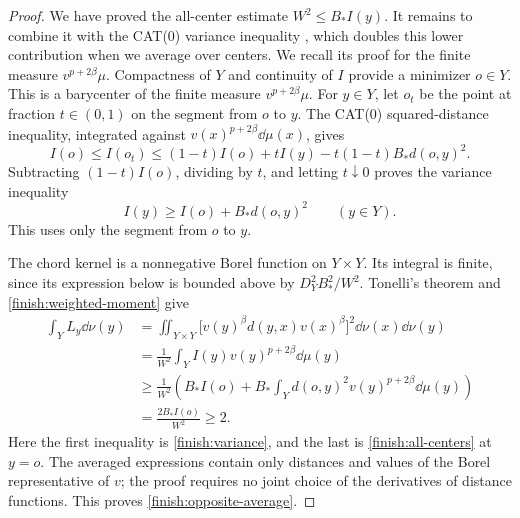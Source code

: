 \begin{proof}
We have proved the all-center estimate \(W^2\le B_*I(y)\).
It remains to combine it with the CAT(0) variance inequality
\cite[Proposition~4.4]{Sturm2003}, which doubles this lower contribution
when we average over centers. We recall its proof for the finite measure
$v^{p+2\beta}\mu$.
Compactness of \(Y\) and continuity of \(I\) provide a minimizer
\(o\in Y\). This is a barycenter of the finite measure
\(v^{p+2\beta}\mu\). For \(y\in Y\), let \(o_t\) be the point at
fraction \(t\in(0,1)\) on the segment from \(o\) to \(y\). The
CAT(0) squared-distance inequality, integrated against
\(v(x)^{p+2\beta}\dd\mu(x)\), gives
\[
 I(o)\le I(o_t)
 \le(1-t)I(o)+tI(y)-t(1-t)B_*d(o,y)^2.
\]
Subtracting \((1-t)I(o)\), dividing by \(t\), and letting
\(t\downarrow0\) proves the variance inequality
\begin{equation}
 \label{finish:variance}
 I(y)\ge I(o)+B_*d(o,y)^2\qquad(y\in Y).
\end{equation}
This uses only the segment from \(o\) to \(y\).

The chord kernel is a nonnegative Borel function on \(Y\times Y\).
Its integral is finite, since its expression below is bounded above by
\(D_Y^2B_*^2/W^2\). Tonelli's theorem and
\eqref{finish:weighted-moment} give
\begin{equation}
 \label{finish:double-integral}
 \begin{aligned}
 \int_YL_y\dd\nu(y)
 &=\iint_{Y\times Y}
       \bigl[v(y)^\beta d(y,x)v(x)^\beta\bigr]^2
             \dd\nu(x)\dd\nu(y)\\
 &=\frac1{W^2}\int_Y I(y)v(y)^{p+2\beta}\dd\mu(y)\\
 &\ge\frac1{W^2}\left(
       B_*I(o)+B_*\int_Y d(o,y)^2v(y)^{p+2\beta}\dd\mu(y)
                  \right)\\
 &=\frac{2B_*I(o)}{W^2}\ge2.
 \end{aligned}
\end{equation}
Here the first inequality is \eqref{finish:variance}, and the last is
\eqref{finish:all-centers} at \(y=o\). The averaged expressions contain
only distances and values of the Borel representative of \(v\); the
proof requires no joint choice of the derivatives of distance
functions. This proves \eqref{finish:opposite-average}.
\end{proof}

